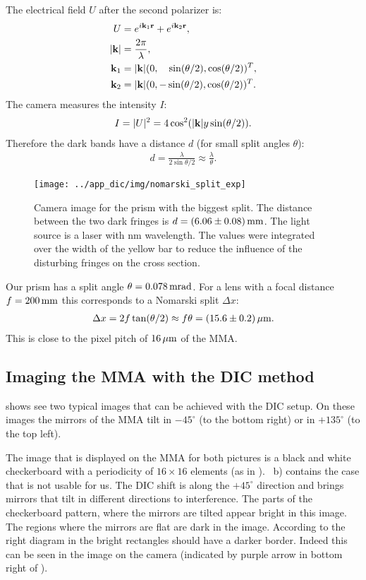 The electrical field $U$ after the second polarizer is:
\begin{align}
  U&=e^{i\mathbf{k}_1\mathbf{r}}+e^{i\mathbf{k}_2\mathbf{r}},\\
  \mathopen| \mathbf{k} \mathclose|&=\frac{2\pi}{\lambda},\\
  \mathbf{k}_1&=\mathopen| \mathbf{k} \mathclose|(0, \hspace{1em}\sin(\theta/2), \cos(\theta/2))^T,\\
  \mathbf{k}_2&=\mathopen| \mathbf{k} \mathclose|(0, -\sin(\theta/2), \cos(\theta/2))^T.
\end{align}
The camera measures the intensity $I$:
\begin{align}
  I=\mathopen| U \mathclose|^2=4\cos^2(\mathopen| \mathbf{k} \mathclose|y\sin(\theta/2)).
\end{align}
Therefore the dark bands have a distance $d$ (for small split angles
$\theta$):
\begin{align}
  d=\frac{\lambda}{2\sin{\theta/2}}\approx \frac{\lambda}{\theta}.
\end{align}
\begin{figure}[htb]
  \centering
  \texttt{[image: ../app\_dic/img/nomarski\_split\_exp]}
  \caption{Camera image for the prism with the biggest split. The
    distance between the two dark fringes is
    $d=\unit[(6.06\pm0.08)]{mm}$. The light source is a laser with
    \unit[473]{nm} wavelength. The values were integrated over the
    width of the yellow bar to reduce the influence of the disturbing
    fringes on the cross section.}
  \label{fig:nomarski_split_exp}
\end{figure}
Our prism has a split angle $\theta=\unit[0.078]{mrad}$.
For a lens with a focal distance $f=\unit[200]{mm}$ this corresponds to a
Nomarski split $\Delta x$:
\begin{align}
  \Delta x=2f\tan(\theta/2)\approx f\theta=\unit[(15.6\pm0.2)]{\mu m}.
\end{align}
This is close to the pixel pitch of $\unit[16]{\mu m}$ of the MMA.

\subsection{Imaging the MMA with the DIC method}
 shows see two typical images that can be
achieved with the DIC setup. On these images the mirrors of the MMA
tilt in $-45^\circ$ (to the bottom right) or in $+135^\circ$ (to the
top left).

The image that is displayed on the MMA for both pictures is a black
and white checkerboard with a periodicity of $16\times16$ elements (as
in ).  ~b) contains the case
that is not usable for us. The DIC shift is along the $+45^\circ$
direction and brings mirrors that tilt in different directions to
interference.  The parts of the checkerboard pattern, where the
mirrors are tilted appear bright in this image. The regions where the
mirrors are flat are dark in the image. According to the right diagram
in  the bright rectangles should have a darker
border. Indeed this can be seen in the image on the camera (indicated
by purple arrow in bottom right of ).

